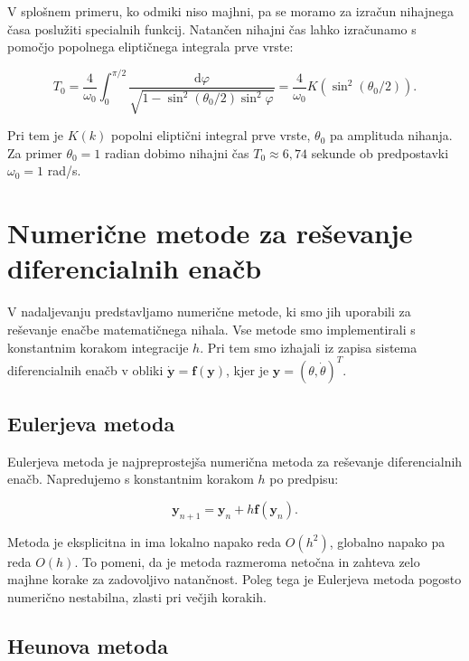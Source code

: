 \documentclass[12pt,a4paper]{article}
\begin{document}
V splošnem primeru, ko odmiki niso majhni, pa se moramo za izračun nihajnega časa poslužiti specialnih funkcij. Natančen nihajni čas lahko izračunamo s pomočjo popolnega eliptičnega integrala prve vrste:

\begin{equation}
T_0 = \frac{4}{\omega_0} \int_0^{\pi/2} \frac{\mathrm{d}\varphi}{\sqrt{1 - \sin^2(\theta_0/2) \sin^2\varphi}} = \frac{4}{\omega_0} K(\sin^2(\theta_0/2)).
\end{equation}

Pri tem je $K(k)$ popolni eliptični integral prve vrste, $\theta_0$ pa amplituda nihanja. Za primer $\theta_0 = 1$ radian dobimo nihajni čas $T_0 \approx 6,74$ sekunde ob predpostavki $\omega_0 = 1$ rad/s.

\section{Numerične metode za reševanje diferencialnih enačb}

V nadaljevanju predstavljamo numerične metode, ki smo jih uporabili za reševanje enačbe matematičnega nihala. Vse metode smo implementirali s konstantnim korakom integracije $h$. Pri tem smo izhajali iz zapisa sistema diferencialnih enačb v obliki $\dot{\mathbf{y}} = \mathbf{f}(\mathbf{y})$, kjer je $\mathbf{y} = (\theta, \dot{\theta})^T$.

\subsection{Eulerjeva metoda}

Eulerjeva metoda je najpreprostejša numerična metoda za reševanje diferencialnih enačb. Napredujemo s konstantnim korakom $h$ po predpisu:

\begin{equation}
\mathbf{y}_{n+1} = \mathbf{y}_n + h \mathbf{f}(\mathbf{y}_n).
\end{equation}

Metoda je eksplicitna in ima lokalno napako reda $O(h^2)$, globalno napako pa reda $O(h)$. To pomeni, da je metoda razmeroma netočna in zahteva zelo majhne korake za zadovoljivo natančnost. Poleg tega je Eulerjeva metoda pogosto numerično nestabilna, zlasti pri večjih korakih.

\subsection{Heunova metoda}
\end{document}

